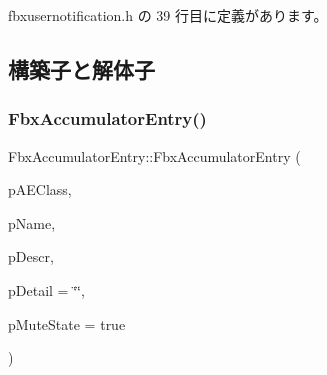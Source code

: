  fbxusernotification.\+h の 39 行目に定義があります。



\subsection{構築子と解体子}
\mbox{\label{class_fbx_accumulator_entry_a08089894e3d5aed12dfc556553e022c4}} 
\subsubsection{\texorpdfstring{Fbx\+Accumulator\+Entry()}{FbxAccumulatorEntry()}\hspace{0.1cm}{\footnotesize\ttfamily [1/2]}}
{\footnotesize\ttfamily Fbx\+Accumulator\+Entry\+::\+Fbx\+Accumulator\+Entry (\begin{DoxyParamCaption}\item[{\hyperlink{class_fbx_accumulator_entry_af08af3ddcbf7e8fe642d7e9ecb4ad0e2}{E\+Class}}]{p\+A\+E\+Class,  }\item[{const \hyperlink{class_fbx_string}{Fbx\+String} \&}]{p\+Name,  }\item[{const \hyperlink{class_fbx_string}{Fbx\+String} \&}]{p\+Descr,  }\item[{\hyperlink{class_fbx_string}{Fbx\+String}}]{p\+Detail = {\ttfamily \char`\"{}\char`\"{}},  }\item[{bool}]{p\+Mute\+State = {\ttfamily true} }\end{DoxyParamCaption})}

